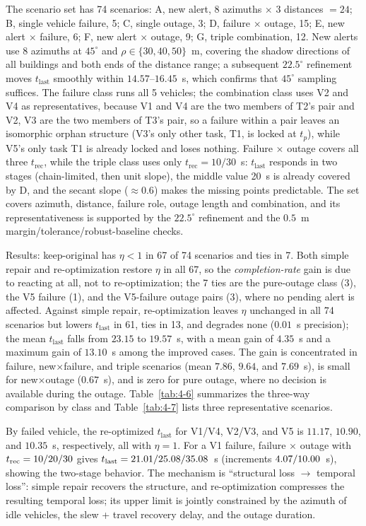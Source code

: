 The scenario set has 74 scenarios: A, new alert, $8$ azimuths $\times$ $3$ distances $=24$; B, single vehicle failure, 5; C, single outage, 3; D, failure $\times$ outage, 15; E, new alert $\times$ failure, 6; F, new alert $\times$ outage, 9; G, triple combination, 12. New alerts use 8 azimuths at $45^\circ$ and $\rho\in\{30,40,50\}$~m, covering the shadow directions of all buildings and both ends of the distance range; a subsequent $22.5^\circ$ refinement moves $t_{\mathrm{last}}$ smoothly within $14.57$--$16.45$~s, which confirms that $45^\circ$ sampling suffices. The failure class runs all 5 vehicles; the combination class uses V2 and V4 as representatives, because V1 and V4 are the two members of T2's pair and V2, V3 are the two members of T3's pair, so a failure within a pair leaves an isomorphic orphan structure (V3's only other task, T1, is locked at $t_p$), while V5's only task T1 is already locked and loses nothing. Failure $\times$ outage covers all three $t_{\mathrm{rec}}$, while the triple class uses only $t_{\mathrm{rec}}=10/30$~s: $t_{\mathrm{last}}$ responds in two stages (chain-limited, then unit slope), the middle value 20~s is already covered by D, and the secant slope ($\approx0.6$) makes the missing points predictable. The set covers azimuth, distance, failure role, outage length and combination, and its representativeness is supported by the $22.5^\circ$ refinement and the $0.5$~m margin/tolerance/robust-baseline checks.

Results: keep-original has $\eta<1$ in 67 of 74 scenarios and ties in 7. Both simple repair and re-optimization restore $\eta$ in all 67, so the \emph{completion-rate} gain is due to reacting at all, not to re-optimization; the 7 ties are the pure-outage class (3), the V5 failure (1), and the V5-failure outage pairs (3), where no pending alert is affected. Against simple repair, re-optimization leaves $\eta$ unchanged in all 74 scenarios but lowers $t_{\mathrm{last}}$ in 61, ties in 13, and degrades none ($0.01$~s precision); the mean $t_{\mathrm{last}}$ falls from $23.15$ to $19.57$~s, with a mean gain of $4.35$~s and a maximum gain of $13.10$~s among the improved cases. The gain is concentrated in failure, new$\times$failure, and triple scenarios (mean $7.86$, $9.64$, and $7.69$~s), is small for new$\times$outage ($0.67$~s), and is zero for pure outage, where no decision is available during the outage. Table~\ref{tab:4-6} summarizes the three-way comparison by class and Table~\ref{tab:4-7} lists three representative scenarios.

By failed vehicle, the re-optimized $t_{\mathrm{last}}$ for V1/V4, V2/V3, and V5 is $11.17$, $10.90$, and $10.35$~s, respectively, all with $\eta=1$. For a V1 failure, failure $\times$ outage with $t_{\mathrm{rec}}=10/\allowbreak20/\allowbreak30$ gives $t_{\mathrm{last}}=21.01/\allowbreak25.08/\allowbreak35.08$~s (increments $4.07/\allowbreak10.00$~s), showing the two-stage behavior. The mechanism is ``structural loss $\to$ temporal loss'': simple repair recovers the structure, and re-optimization compresses the resulting temporal loss; its upper limit is jointly constrained by the azimuth of idle vehicles, the slew + travel recovery delay, and the outage duration.

